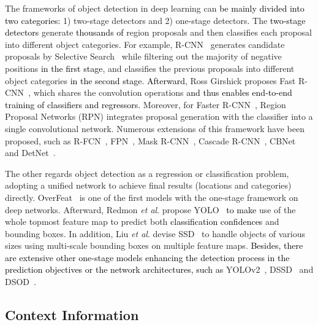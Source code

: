 \documentclass[journal]{IEEEtran}
\newcommand{\etal}{\textit{et al}.\xspace}
\def\myblue{\textcolor{black}}
\begin{document}
	The frameworks of object detection in deep learning can 
\myblue{be mainly divided into two categories:}
    1) two-stage detectors and 2) one-stage detectors.
	The \myblue{two-stage detectors} generate \myblue{thousands of} region proposals and then classifies each proposal into different object categories. For example, R-CNN~\cite{girshick2014rich} generates  candidate proposals by Selective Search~\cite{uijlings2013selective} while filtering out the majority of negative positions \myblue{in the first stage}, and classifies the previous proposals into different object categories \myblue{in the second stage}.
	\myblue{Afterward}, Ross Girshick proposes Fast R-CNN~\cite{girshick2015fast}, which shares the convolution operations \myblue{and thus enables end-to-end training of classifiers and regressors.}
	Moreover, for Faster R-CNN~\cite{ren2015faster}, Region Proposal Networks (RPN) integrates proposal generation with the classifier into a single convolutional network.
Numerous extensions of this framework have been proposed, such as R-FCN~\cite{dai2016r}, FPN~\cite{lin2017feature}, Mask R-CNN~\cite{he2017mask}, Cascade R-CNN~\cite{cai2018cascade}, CBNet~\cite{liu2019cbnet} and DetNet~\cite{li2018detnet}.
	
	The other regards object detection as a regression or classification problem, adopting a unified network to achieve final results (locations and categories) directly. 
	OverFeat~\cite{sermanet2013overfeat} is one of the first models with the one-stage framework on deep networks. Afterward, Redmon \etal propose YOLO~\cite{redmon2016you} \myblue{to make} use of the whole topmost feature map to predict both \myblue{classification confidences} and bounding boxes. In addition, Liu \etal devise SSD~\cite{liu2016ssd} to handle objects of various sizes using multi-scale bounding boxes on multiple feature maps. 
\myblue{Besides, there are extensive other one-stage models enhancing the detection process in the prediction objectives or the network architectures, such as}
	YOLOv2~\cite{redmon2017yolo9000}, DSSD~\cite{fu2017dssd} and DSOD~\cite{shen2017dsod}.
	
	\subsection{Context Information}
	
\end{document}
